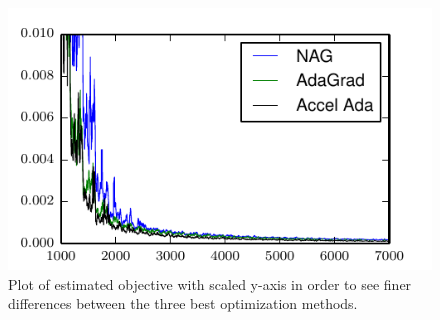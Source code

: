\documentclass[12pt,english]{article}
\newcommand{\1}{\mathbb{I}} %
\begin{document}
\begin{figure}[h!]
    \centering
    \includegraphics{../plots/bestcurves.pdf}
    \caption{\label{fig:bestcurves} Plot of estimated objective with scaled
y-axis in order to see finer differences between the three best optimization
methods.}
\end{figure}

{}

\end{document}

